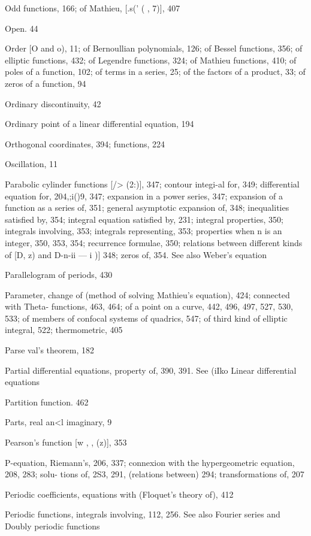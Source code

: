 Odd functions, 166; of Mathieu, [.s(' ( , 7)], 407

Open. 44

Order [O and o), 11; of Bernoullian polynomials, 126; of Bessel functions, 356; of elliptic
functions, 432; of Legendre functions, 324; of Mathieu functions, 410; of poles of a
function, 102; of terms in a series, 25; of the factors of a product, 33; of zeros of a
function, 94

Ordinary discontinuity, 42

Ordinary point of a linear differential equation, 194

Orthogonal coordinates, 394; functions, 224

Oscillation, 11

Parabolic cylinder functions [/>  (2:)], 347; contour integi-al for, 349; differential equation for,
204,;i()9, 347; expansion in a power series, 347; expansion of a function as a series of, 351;
general asymptotic expansion of, 348; inequalities satisfied by, 354; integral equation
satisfied by, 231; integral properties, 350; integrals involving, 353; integrals representing,
353; properties when n is an integer, 350, 353, 354; recurrence formulae, 350; relations
between different kinds of [D,  z) and D-n-ii — i )]  348; zeros of, 354. See also Weber's
equation

Parallelogram of periods, 430

Parameter, change of (method of solving Mathieu's equation), 424; connected with Theta-
functions, 463, 464; of a point on a curve, 442, 496, 497, 527, 530, 533; of members of
confocal systems of quadrics, 547; of third kind of elliptic integral, 522; thermometric, 405

Parse val's theorem, 182

Partial differential equations, property of, 390, 391. See (iIko Linear differential equations

Partition function. 462

Parts, real an<l imaginary, 9

Pearson's function [w ,  , (z)], 353

P-equation, Riemann's, 206, 337; connexion with the hypergeometric equation, 208, 283; solu-
tions of, 2S3, 291, (relations between) 294; transformations of, 207

Periodic coefficients, equations with (Floquet's theory of), 412

Periodic functions, integrals involving, 112, 256. See also Fourier series and Doubly periodic
functions

